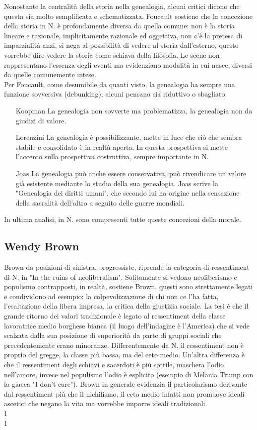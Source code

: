 \documentclass[10pt,a4paper]{article}
\begin{document}
Nonostante la centralità della storia nella genealogia, alcuni critici dicono che questa sia molto semplificata e schematizzata. Foucault sostiene che la concezione della storia in N. è profondamente diversa da quella comune: non è la storia lineare e razionale, implicitamente razionale ed oggettiva, non c'è la pretesa di imparzialità anzi, si nega al possibilità di vedere al storia dall'esterno, questo vorrebbe dire vedere la storia come schiava della filosofia. Le scene non rappresentano l'essenza degli eventi ma evidenziano modalità in cui nasce, diversi da quelle comunemente intese.\\
Per Foucault, come desumibile da quanti visto, la genealogia ha sempre una funzione sovversiva (debunking), alcuni pensano sia riduttivo o sbagliato:
\begin{itemize}
	\item[Koopman] La genealogia non sovverte ma problematizza, la genealogia non da giudizi di valore. 
	\item[Lorenzini] La genealogia è possibilizzante, mette in luce che ciò che sembra stabile e consolidato è in realtà aperta. In questa prospettiva si mette l'accento sulla prospettiva costruttiva, sempre importante in N.
	\item[Joas] La genealogia può anche essere conservativa, può rivendicare un valore già esistente mediante lo studio della sua genealogia. Joas scrive la "Genealogia dei diritti umani", che secondo lui ha origine nella sensazione della sacralità dell'altro a seguito delle guerre mondiali. 
\end{itemize}
In ultima analisi, in N. sono compresenti tutte queste concezioni della morale. 
\subsection{Wendy Brown}
Brown da posizioni di sinistra, progressiste, riprende la categoria di ressentiment di N. in "In the ruins of neoliberalism". Solitamente si vedono neoliberismo e populismo contrapposti, in realtà, sostiene Brown, questi sono strettamente legati e condividono ad esempio: la colpevolizzazione di chi non ce l'ha fatta, l'esaltazione della libera impresa, la critica della giustizia sociale. La tesi è che il grande ritorno dei valori tradizionale è legato al ressentiment della classe lavoratrice medio borghese bianca (il luogo dell'indagine è l'America) che si vede scalzata dalla sua posizione di superiorità da parte di gruppi sociali che precedentemente erano minoranze. Differentemente da N. il ressentiment non è proprio del gregge, la classe più bassa, ma del ceto medio. Un'altra differenza è che il ressentiment degli schiavi e sacerdoti è più sottile, maschera l'odio nell'amore, invece nel populismo l'odio è esplicito (esempio di Melania Trump con la giacca "I don't care"). Brown in generale evidenzia il particolarismo derivante dal ressentiment più che il nichilismo, il ceto medio infatti non promuove ideali ascetici che negano la vita ma vorrebbe imporre ideali tradizionali. \\1\\1\  
\end{document}
